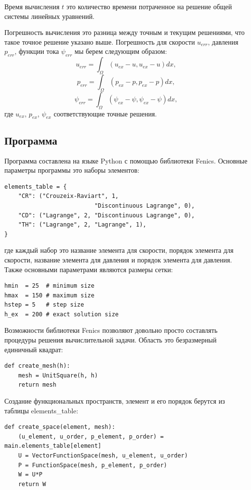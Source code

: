 \documentclass[12pt]{article}
\begin{document}
Время вычисления $t$ это количество времени потраченное на решение общей системы линейных уравнений.

Погрешность вычисления это разница между точным и текущим решениями, что такое точное решение указано выше. Погрешность для скорости $u_{err}$, давления $p_{err}$, функции тока $\psi_{err}$ мы берем следующим образом:
\begin{equation}
u_{err} = \int_{\Omega} (u_{ex} - u, u_{ex} - u) dx,
\end{equation}
\begin{equation}
p_{err} = \int_{\Omega} (p_{ex} - p, p_{ex} - p) dx,
\end{equation}
\begin{equation}
\psi_{err} = \int_{\Omega} (\psi_{ex} - \psi, \psi_{ex} - \psi) dx,
\end{equation}
где $u_{ex}$, $p_{ex}$, $\psi_{ex}$ соответствующие точные решения.

\subsection{Программа}
Программа составлена на языке Python с помощью библиотеки Fenics.
Основные параметры программы это наборы элементов:
\begin{lstlisting}
elements_table = {
    "CR": ("Crouzeix-Raviart", 1, 
                          "Discontinuous Lagrange", 0),
    "CD": ("Lagrange", 2, "Discontinuous Lagrange", 0),    
    "TH": ("Lagrange", 2, "Lagrange", 1),
}
\end{lstlisting}
где каждый набор это название элемента для скорости, порядок элемента для скорости, название элемента для давления и порядок элемента для давления. Также основными параметрами являются размеры сетки:
\begin{lstlisting}
hmin  = 25  # minimum size
hmax  = 150 # maximum size
hstep = 5   # step size
h_ex  = 200 # exact solution size
\end{lstlisting}

Возможности библиотеки Fenics позволяют довольно просто составлять процедуры решения вычислительной задачи. Область это безразмерный единичный квадрат:
\begin{lstlisting}
def create_mesh(h):
    mesh = UnitSquare(h, h)
    return mesh
\end{lstlisting}

Создание функциональных пространств, элемент и его порядок берутся из таблицы elements\_table:
\begin{lstlisting}
def create_space(element, mesh):
    (u_element, u_order, p_element, p_order) = main.elements_table[element]
    U = VectorFunctionSpace(mesh, u_element, u_order)
    P = FunctionSpace(mesh, p_element, p_order)
    W = U*P
    return W
\end{lstlisting}
\end{document}
